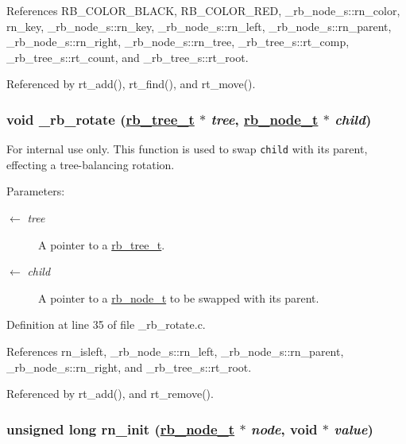References RB\_\-COLOR\_\-BLACK, RB\_\-COLOR\_\-RED, \_\-rb\_\-node\_\-s::rn\_\-color, rn\_\-key, \_\-rb\_\-node\_\-s::rn\_\-key, \_\-rb\_\-node\_\-s::rn\_\-left, \_\-rb\_\-node\_\-s::rn\_\-parent, \_\-rb\_\-node\_\-s::rn\_\-right, \_\-rb\_\-node\_\-s::rn\_\-tree, \_\-rb\_\-tree\_\-s::rt\_\-comp, \_\-rb\_\-tree\_\-s::rt\_\-count, and \_\-rb\_\-tree\_\-s::rt\_\-root.

Referenced by rt\_\-add(), rt\_\-find(), and rt\_\-move().\hypertarget{group__dbprim__rbtree_ga15}{
\subsubsection[\_\-rb\_\-rotate]{\setlength{\rightskip}{0pt plus 5cm}void \_\-rb\_\-rotate (\hyperlink{struct__rb__tree__s}{rb\_\-tree\_\-t} $\ast$ {\em tree}, \hyperlink{struct__rb__node__s}{rb\_\-node\_\-t} $\ast$ {\em child})}}
\label{group__dbprim__rbtree_ga15}


\begin{Desc}
\item[For internal use only.]
This function is used to swap {\tt child} with its parent, effecting a tree-balancing rotation.

\begin{Desc}
\item[Parameters:]
\begin{description}
\item[\mbox{$\leftarrow$} {\em tree}]A pointer to a \hyperlink{group__dbprim__rbtree_ga0}{rb\_\-tree\_\-t}. \item[\mbox{$\leftarrow$} {\em child}]A pointer to a \hyperlink{group__dbprim__rbtree_ga1}{rb\_\-node\_\-t} to be swapped with its parent.\end{description}
\end{Desc}
\end{Desc}


Definition at line 35 of file \_\-rb\_\-rotate.c.

References rn\_\-isleft, \_\-rb\_\-node\_\-s::rn\_\-left, \_\-rb\_\-node\_\-s::rn\_\-parent, \_\-rb\_\-node\_\-s::rn\_\-right, and \_\-rb\_\-tree\_\-s::rt\_\-root.

Referenced by rt\_\-add(), and rt\_\-remove().\hypertarget{group__dbprim__rbtree_ga13}{
\subsubsection[rn\_\-init]{\setlength{\rightskip}{0pt plus 5cm}unsigned long rn\_\-init (\hyperlink{struct__rb__node__s}{rb\_\-node\_\-t} $\ast$ {\em node}, void $\ast$ {\em value})}}
\label{group__dbprim__rbtree_ga13}


